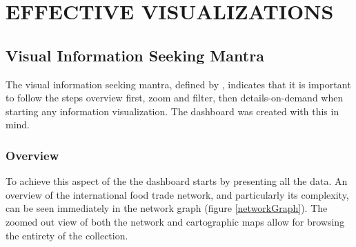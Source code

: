 \chapter{EFFECTIVE VISUALIZATIONS}
\label{effectiveVisualizationsChapter}
\section{Visual Information Seeking Mantra}
The visual information seeking mantra, defined by \cite{shneiderman1996eyes}, indicates that it is important to follow the steps overview first, zoom and filter, then details-on-demand when starting any information visualization. The dashboard was created with this in mind.
\subsection{Overview}
To achieve this aspect of the the dashboard starts by presenting all the data. An overview of the international food trade network, and particularly its complexity, can be seen immediately in the network graph (figure \ref{networkGraph}). The zoomed out view of both the network and cartographic maps allow for browsing the entirety of the collection.
